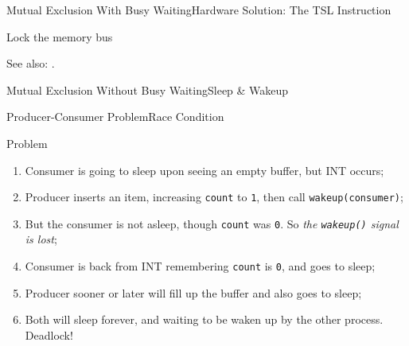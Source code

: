 \begin{frame}{Mutual Exclusion With Busy Waiting}{Hardware Solution: The TSL Instruction}
  \begin{block}{Lock the memory bus}
    \begin{center}
    \end{center}
  \end{block}
\end{frame}

See also: .

\begin{frame}{Mutual Exclusion Without Busy Waiting}{Sleep \& Wakeup}
  \begin{center}
  \end{center}
\end{frame}

\begin{frame}{Producer-Consumer Problem}{Race Condition}
  \begin{block}{Problem}
    \begin{enumerate}
    \item Consumer is going to sleep upon seeing an empty buffer, but INT occurs;
    \item Producer inserts an item, increasing \texttt{count} to \texttt{1}, then call
      \texttt{wakeup(consumer)};
    \item But the consumer is not asleep, though \texttt{count} was \texttt{0}. So \emph{the
        \texttt{wakeup()} signal is lost};
    \item Consumer is back from INT remembering \texttt{count} is \texttt{0}, and goes to
      sleep;
    \item Producer sooner or later will fill up the buffer and also goes to sleep;
    \item Both will sleep forever, and waiting to be waken up by the other
      process. Deadlock!
    \end{enumerate}
  \end{block}
\end{frame}

